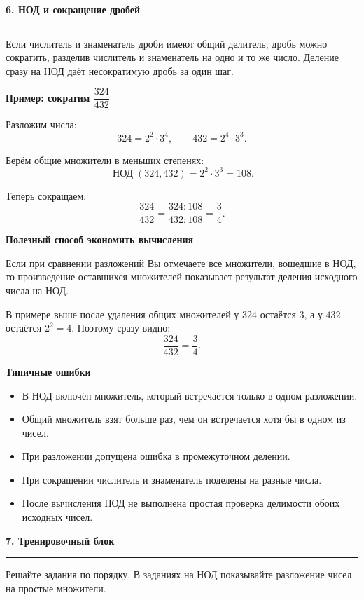 \documentclass[a4paper,12pt]{article}
\newcommand{\sectiontitle}[1]{%
  \vspace{0.25em}%
  {\Large\bfseries\color{darkaccent}#1\par}%
  \vspace{0.3em}%
  {\color{linegray}\rule{\linewidth}{0.6pt}}%
  \vspace{0.5em}%
}
\newcommand{\subsectiontitle}[1]{%
  \vspace{0.2em}%
  {\large\bfseries\color{accent}#1\par}%
  \vspace{0.15em}%
}
\newcommand{\nodop}{\mathop{\text{НОД}}\nolimits}
\begin{document}
\clearpage

\sectiontitle{6. НОД и сокращение дробей}

Если числитель и знаменатель дроби имеют общий делитель, дробь можно сократить, разделив числитель и знаменатель на одно и то же число. Деление сразу на НОД даёт несократимую дробь за один шаг.

\subsectiontitle{Пример: сократим $\dfrac{324}{432}$}

Разложим числа:
\[
  324=2^2\cdot3^4,
  \qquad
  432=2^4\cdot3^3.
\]

Берём общие множители в меньших степенях:
\[
  \nodop(324,432)=2^2\cdot3^3=108.
\]

Теперь сокращаем:
\[
  \frac{324}{432}
  =\frac{324:108}{432:108}
  =\frac34.
\]

\subsectiontitle{Полезный способ экономить вычисления}

Если при сравнении разложений Вы отмечаете все множители, вошедшие в НОД, то произведение оставшихся множителей показывает результат деления исходного числа на НОД.

В примере выше после удаления общих множителей у $324$ остаётся $3$, а у $432$ остаётся $2^2=4$. Поэтому сразу видно:
\[
  \frac{324}{432}=\frac34.
\]

\subsectiontitle{Типичные ошибки}

\begin{itemize}
  \item В НОД включён множитель, который встречается только в одном разложении.
  \item Общий множитель взят больше раз, чем он встречается хотя бы в одном из чисел.
  \item При разложении допущена ошибка в промежуточном делении.
  \item При сокращении числитель и знаменатель поделены на разные числа.
  \item После вычисления НОД не выполнена простая проверка делимости обоих исходных чисел.
\end{itemize}

\clearpage
\sectiontitle{7. Тренировочный блок}

Решайте задания по порядку. В заданиях на НОД показывайте разложение чисел на простые множители.
\end{document}
